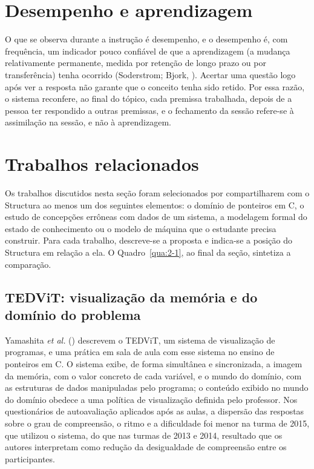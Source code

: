 \section{Desempenho e aprendizagem}

O que se observa durante a instrução é desempenho, e o desempenho é, com frequência, um indicador pouco confiável de que a aprendizagem (a mudança relativamente permanente, medida por retenção de longo prazo ou por transferência) tenha ocorrido (Soderstrom; Bjork, \citeyear{soderstrom2015}). Acertar uma questão logo após ver a resposta não garante que o conceito tenha sido retido. Por essa razão, o sistema reconfere, ao final do tópico, cada premissa trabalhada, depois de a pessoa ter respondido a outras premissas, e o fechamento da sessão refere-se à assimilação na sessão, e não à aprendizagem.

\section{Trabalhos relacionados}

Os trabalhos discutidos nesta seção foram selecionados por compartilharem com o Structura ao menos um dos seguintes elementos: o domínio de ponteiros em C, o estudo de concepções errôneas com dados de um sistema, a modelagem formal do estado de conhecimento ou o modelo de máquina que o estudante precisa construir. Para cada trabalho, descreve-se a proposta e indica-se a posição do Structura em relação a ela. O Quadro~\ref{qua:2-1}, ao final da seção, sintetiza a comparação.

\subsection{TEDViT: visualização da memória e do domínio do problema}

Yamashita \textit{et al.} (\citeyear{yamashita2017}) descrevem o TEDViT, um sistema de visualização de programas, e uma prática em sala de aula com esse sistema no ensino de ponteiros em C. O sistema exibe, de forma simultânea e sincronizada, a imagem da memória, com o valor concreto de cada variável, e o mundo do domínio, com as estruturas de dados manipuladas pelo programa; o conteúdo exibido no mundo do domínio obedece a uma política de visualização definida pelo professor. Nos questionários de autoavaliação aplicados após as aulas, a dispersão das respostas sobre o grau de compreensão, o ritmo e a dificuldade foi menor na turma de 2015, que utilizou o sistema, do que nas turmas de 2013 e 2014, resultado que os autores interpretam como redução da desigualdade de compreensão entre os participantes.

